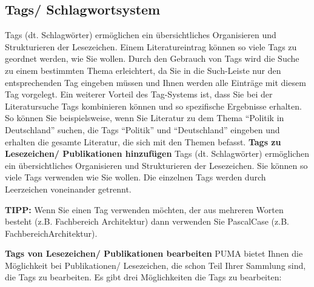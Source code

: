 \documentclass[b5paper,11pt,twoside]{scrbook} %
\begin{document}
\subsection{Tags/ Schlagwortsystem}
Tags (dt. Schlagwörter) ermöglichen ein übersichtliches Organisieren und Strukturieren der Lesezeichen. Einem Literatureintrag können so viele Tags zu geordnet werden, wie Sie wollen. Durch den Gebrauch von Tags wird die Suche zu einem bestimmten Thema erleichtert, da Sie in die Such-Leiste nur den entsprechenden Tag eingeben müssen und Ihnen werden alle Einträge mit diesem Tag vorgelegt. Ein weiterer Vorteil des Tag-Systems ist, dass Sie bei der Literatursuche  Tags kombinieren können und so spezifische Ergebnisse erhalten. So können Sie beispielsweise, wenn Sie Literatur zu dem Thema \enquote{Politik in Deutschland} suchen, die Tags \enquote{Politik} und \enquote{Deutschland} eingeben und erhalten die gesamte Literatur, die sich mit den Themen befasst. 
\newline
\newline
\textbf{Tags zu Lesezeichen/ Publikationen hinzufügen}\newline
Tags (dt. Schlagwörter) ermöglichen ein übersichtliches Organisieren und Strukturieren der Lesezeichen. Sie können so viele Tags verwenden wie Sie wollen. Die einzelnen Tags werden durch Leerzeichen voneinander getrennt. 
\begin{shaded}
\centering \textbf{TIPP:} Wenn Sie einen Tag verwenden möchten, der aus mehreren Worten besteht (z.B. Fachbereich Architektur) dann verwenden Sie PascalCase (z.B. FachbereichArchitektur). 
\end{shaded}
\textbf{Tags von Lesezeichen/ Publikationen bearbeiten} \newline
PUMA bietet Ihnen die Möglichkeit bei Publikationen/ Lesezeichen, die schon Teil Ihrer Sammlung sind, die Tags zu bearbeiten. Es gibt drei Möglichkeiten die Tags zu bearbeiten:
\end{document}
